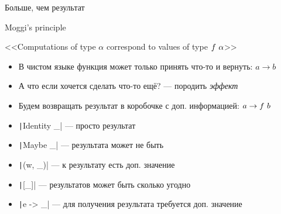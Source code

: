     \begin{frame}[fragile]{Больше, чем результат \popslide}
        \begin{block}{Moggi's principle}
            \begin{center}
                \large
                \vspace{0.3em}
                <<Computations of type $\alpha$ correspond to values of type $f~\alpha$>>
                \vspace{0.3em}
            \end{center}
        \end{block}
        \begin{itemize}
            \item В чистом языке функция может только принять что-то и вернуть: $a\to b$
            \item А что если хочется сделать что-то ещё? --- породить \emph{эффект}
            \item Будем возвращать результат в коробочке с доп. информацией: $a\to f~ b$
            \item[\eg] \texttt|Identity _| --- просто результат
            \item[\eg] \texttt|Maybe _| --- результата может не быть
            \item[\eg] \texttt|(w, _)| --- к результату есть доп. значение
            \item[\eg] \texttt|[_]| --- результатов может быть сколько угодно
            \item[\eg] \texttt|e -> _| --- для получения результата требуется доп. значение
        \end{itemize}
    \end{frame}

